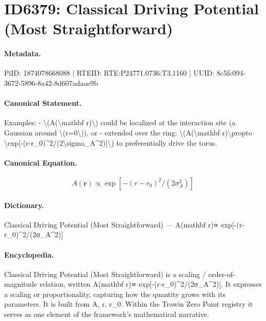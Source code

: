 \section*{ID6379: Classical Driving Potential (Most Straightforward)}
\paragraph{Metadata.}
PiID: 1874078668088 | RTEID: RTE:P24771.0736:T3.1160 | UUID: 8c5fc094-3672-5896-8a42-8d607adaae9b

\paragraph{Canonical Statement.}
Examples: - \textbackslash{}(A(\textbackslash{}mathbf r)\textbackslash{}) could be localized at the interaction site (a Gaussian around \textbackslash{}(r=0\textbackslash{})), or - extended over the ring: \textbackslash{}(A(\textbackslash{}mathbf r)\textbackslash{}propto \textbackslash{}exp[-(r-r\_0)\textasciicircum{}2/(2\textbackslash{}sigma\_A\textasciicircum{}2)]\textbackslash{}) to preferentially drive the torus.

\paragraph{Canonical Equation.}
\[
A(\mathbf r)\propto \exp[-(r-r_0)^2/(2\sigma_A^2)]
\]

\paragraph{Dictionary.}
Classical Driving Potential (Most Straightforward) — A(mathbf r)∝ exp[-(r-r\_0)\textasciicircum{}2/(2σ\_A\textasciicircum{}2)]

\paragraph{Encyclopedia.}
Classical Driving Potential (Most Straightforward) is a scaling / order-of-magnitude relation, written A(mathbf r)∝ exp[-(r-r\_0)\textasciicircum{}2/(2σ\_A\textasciicircum{}2)]. It expresses a scaling or proportionality, capturing how the quantity grows with its parameters. It is built from A, r, r\_0. Within the Trawin Zero Point registry it serves as one element of the framework's mathematical narrative.
